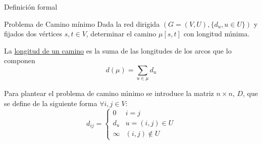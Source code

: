 \documentclass[aspectratio=169]{beamer}
\begin{document}
\begin{frame}{Definición formal}
\begin{block}{Problema de Camino mínimo}
Dada la red dirigida $(G=(V,U), \{ d_u, u \in U \} )$ y fijados dos
v\'{e}rtices $s,t \in V$, determinar el camino $\mu [s,t]$ con longitud m\'{\i}nima.

La \underline{longitud de un camino} es la suma de las longitudes de los
arcos que lo componen
$$ d(\mu ) = \sum_{u \in \mu } d_u $$
\end{block}

Para plantear el problema de camino m\'{\i}nimo se introduce
la matriz $n \times n$,
$D$, que se define de la siguiente forma  $\forall i, j \in V$:
$$ d_{ij} = \left\{ \begin{array}{ll} 0 & i = j \\ d_u & u=(i,j) \in U \\
	\infty & (i,j) \not\in U \end{array} \right. $$

\end{frame}

\end{document}
